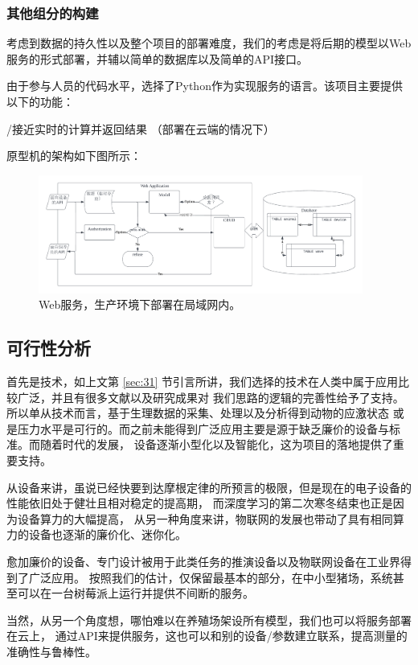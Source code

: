 \documentclass[UTF8]{ctexart}
\begin{document}
\subsubsection{其他组分的构建}

考虑到数据的持久性以及整个项目的部署难度，我们的考虑是将后期的模型以Web服务的形式部署，并辅以简单的数据库以及简单的API接口。
\par
由于参与人员的代码水平，选择了Python作为实现服务的语言。该项目主要提供以下的功能：
\begin{itemize}
    /接近实时的计算并返回结果
    （部署在云端的情况下）
\end{itemize}

原型机的架构如下图所示：%

\begin{figure}[H]
\includegraphics[width=0.95\textwidth]{WebService.png}
\centering
\caption{Web服务，生产环境下部署在局域网内。}
\end{figure}

\subsection{可行性分析}

首先是技术，如上文第 \ref{sec:31} 节引言所讲，我们选择的技术在人类中属于应用比较广泛，并且有很多文献以及研究成果对
我们思路的逻辑的完善性给予了支持。所以单从技术而言，基于生理数据的采集、处理以及分析得到动物的应激状态
或是压力水平是可行的。而之前未能得到广泛应用主要是源于缺乏廉价的设备与标准。而随着时代的发展，
设备逐渐小型化以及智能化，这为项目的落地提供了重要支持。
\par
从设备来讲，虽说已经快要到达摩根定律的所预言的极限，但是现在的电子设备的性能依旧处于健壮且相对稳定的提高期，
而深度学习的第二次寒冬结束也正是因为设备算力的大幅提高，
从另一种角度来讲，物联网的发展也带动了具有相同算力的设备也逐渐的廉价化、迷你化。
\par
愈加廉价的设备、专门设计被用于此类任务的推演设备以及物联网设备在工业界得到了广泛应用。
按照我们的估计，仅保留最基本的部分，在中小型猪场，系统甚至可以在一台树莓派上运行并提供不间断的服务。
\par
当然，从另一个角度想，哪怕难以在养殖场架设所有模型，我们也可以将服务部署在云上，
通过API来提供服务，这也可以和别的设备/参数建立联系，提高测量的准确性与鲁棒性。
\end{document}
